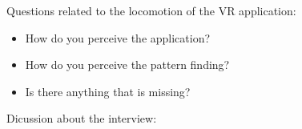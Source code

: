 Questions related to the locomotion of the VR application:
\begin{itemize}
  \item How do you perceive the application?
  \item How do you perceive the pattern finding?
  \item Is there anything that is missing?
\end{itemize}

Dicussion about the interview:
%


